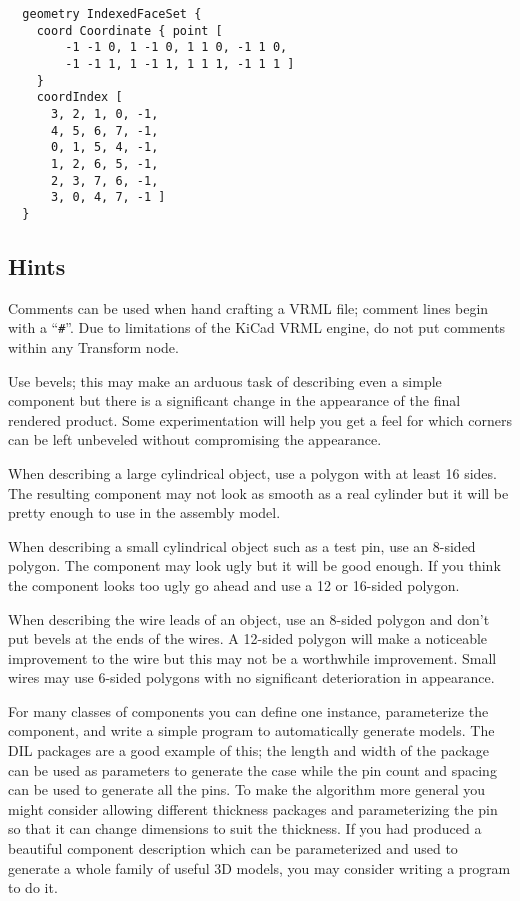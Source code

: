 \documentclass[a4paper]{article}
\begin{document}
\begin{verbatim}
  geometry IndexedFaceSet {
    coord Coordinate { point [
        -1 -1 0, 1 -1 0, 1 1 0, -1 1 0,
        -1 -1 1, 1 -1 1, 1 1 1, -1 1 1 ]
    }
    coordIndex [
      3, 2, 1, 0, -1,
      4, 5, 6, 7, -1,
      0, 1, 5, 4, -1,
      1, 2, 6, 5, -1,
      2, 3, 7, 6, -1,
      3, 0, 4, 7, -1 ]
  }
\end{verbatim}

\subsection{Hints}
Comments can be used when hand crafting a VRML file; comment lines begin with a ``\verb~#~''. Due to
limitations of the KiCad VRML engine, do not put comments within any Transform node.

Use bevels; this may make an arduous task of describing even a simple component but there is a significant
change in the appearance of the final rendered product. Some experimentation will help you get a feel for
which corners can be left unbeveled without compromising the appearance.

When describing a large cylindrical object, use a polygon with at least 16 sides. The resulting component
may not look as smooth as a real cylinder but it will be pretty enough to use in the assembly model.

When describing a small cylindrical object such as a test pin, use an 8-sided polygon. The component may
look ugly but it will be good enough. If you think the component looks too ugly go ahead and use a 12 or
16-sided polygon.

When describing the wire leads of an object, use an 8-sided polygon and don't put bevels at the ends
of the wires. A 12-sided polygon will make a noticeable improvement to the wire but this may not be a
worthwhile improvement. Small wires may use 6-sided polygons with no significant deterioration in
appearance.

For many classes of components you can define one instance, parameterize the component, and write a simple
program to automatically generate models. The DIL packages are a good example of this; the length and
width of the package can be used as parameters to generate the case while the pin count and spacing can be
used to generate all the pins. To make the algorithm more general you might consider allowing different
thickness packages and parameterizing the pin so that it can change dimensions to suit the thickness. If you
had produced a beautiful component description which can be parameterized and used to generate a whole
family of useful 3D models, you may consider writing a program to do it.
\end{document}
